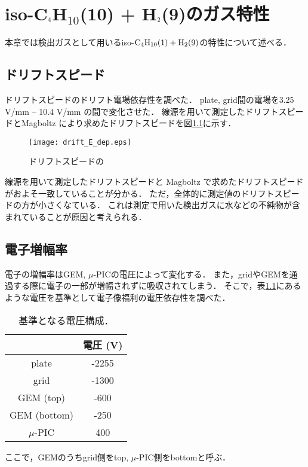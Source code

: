 \documentclass[../master]{subfiles}
\begin{document}
\chapter{iso-C$_{\text 4}$H$_{\text{10}}$(10) + H$_{\text 2}$(9)のガス特性}
本章では検出ガスとして用いるiso-$\rm C_{4}H_{10} (1) + H_{2} (9)$の特性について述べる．
\section{ドリフトスピード}
ドリフトスピードのドリフト電場依存性を調べた．
plate, grid間の電場を3.25 V/mm -- 10.4 V/mm の間で変化させた．
線源を用いて測定したドリフトスピードとMagboltz により求めたドリフトスピードを図\ref{fig::drift_speed_E_dep}に示す．
\begin{figure}
  \centering
  \texttt{[image: drift\_E\_dep.eps]}
  \caption{ドリフトスピードの}
  \label{fig::drift_speed_E_dep}
\end{figure}
線源を用いて測定したドリフトスピードと Magboltz で求めたドリフトスピードがおよそ一致していることが分かる．
ただ，全体的に測定値のドリフトスピードの方が小さくなている．
これは測定で用いた検出ガスに水などの不純物が含まれていることが原因と考えられる．

\section{電子増幅率}
電子の増幅率はGEM, $\mu$-PICの電圧によって変化する．
また，gridやGEMを通過する際に電子の一部が増幅されずに吸収されてしまう．
そこで，表\ref{tab::voltage_configuration}にあるような電圧を基準として電子像福利の電圧依存性を調べた．
\begin{table}
  \centering
  \caption{基準となる電圧構成．}
  \label{tab::voltage_configuration}
  \begin{tabular}{cc}
    \toprule
    & 電圧 (V)\\
    \midrule
    plate & -2255 \\
    grid & -1300 \\
    GEM (top) & -600 \\
    GEM (bottom) & -250 \\
    $\mu$-PIC & 400\\
    \bottomrule 
  \end{tabular}
\end{table}
ここで，GEMのうちgrid側をtop, $\mu$-PIC側をbottomと呼ぶ．
\end{document}

